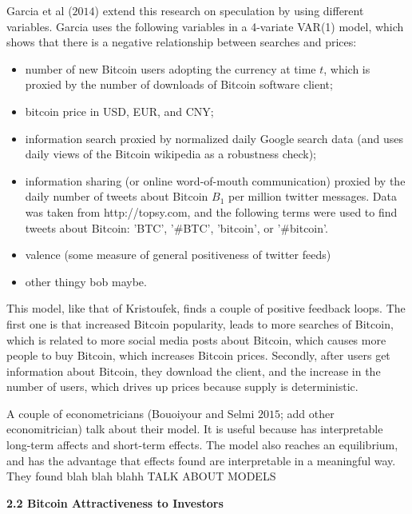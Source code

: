 \documentclass{article}[10 pt]
\newcommand{\vs}{\vspace{0.1in}}
\begin{document}
\vs

Garcia et al ($2014$) extend this research on speculation by using different
variables. Garcia uses the following variables in a 4-variate VAR(1)
model, which shows that there is a negative relationship between searches and
prices:

\begin{itemize}
    \item number of new Bitcoin users adopting the currency at time $t$,
        which is proxied by the number of downloads of Bitcoin software
        client;
    \item bitcoin price in USD, EUR, and CNY;
    \item information search proxied by normalized daily Google search data
        (and uses daily views of the Bitcoin wikipedia as a robustness
        check);
    \item information sharing (or online word-of-mouth communication)
        proxied by the daily number of tweets about Bitcoin $B_1$ per
        million twitter messages. Data was taken from http://topsy.com, and
        the following terms were used to find tweets about Bitcoin: 'BTC',
        '\#BTC', 'bitcoin', or '\#bitcoin'.
    \item valence (some measure of general positiveness of twitter feeds)
    \item other thingy bob maybe.
\end{itemize}

\vs

This model, like that of Kristoufek, finds a couple of positive
feedback loops. The first one is that increased Bitcoin popularity, leads to
more searches of Bitcoin, which is related to more social media posts about
Bitcoin, which causes more people to buy Bitcoin, which increases Bitcoin
prices. Secondly, after users get information about Bitcoin, they download
the client, and the increase in the number of users, which drives up prices because
supply is deterministic.

\vs

A couple of econometricians (Bouoiyour and Selmi $2015$; add other
economitrician) talk about their
model. It is useful because has interpretable long-term affects and
short-term effects. The model also reaches an equilibrium, and has the
advantage that effects found are interpretable in a meaningful way. They
found blah blah blahh TALK ABOUT MODELS 

\vs

\textbf{2.2 Bitcoin Attractiveness to Investors}
\end{document}
